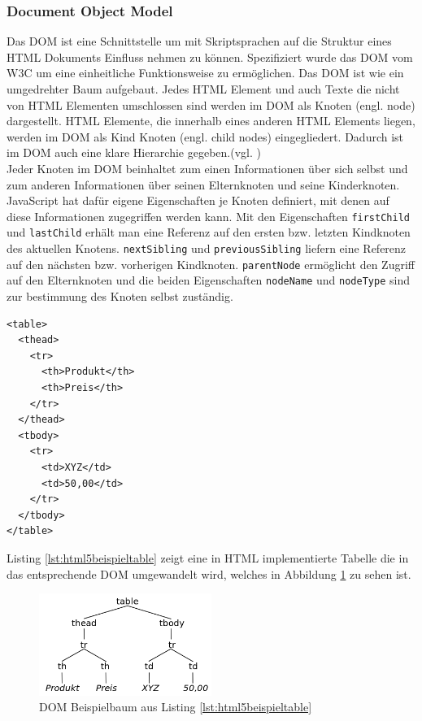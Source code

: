 \subsubsection{Document Object Model} Das DOM ist eine Schnittstelle um mit Skriptsprachen auf die Struktur eines HTML Dokuments Einfluss nehmen zu können. Spezifiziert wurde das DOM vom W3C um eine einheitliche Funktionsweise zu ermöglichen. Das DOM ist wie ein umgedrehter Baum aufgebaut. Jedes HTML Element und auch Texte die nicht von HTML Elementen umschlossen sind werden im DOM als Knoten (engl. node) dargestellt. HTML Elemente, die innerhalb eines anderen HTML Elements liegen, werden im DOM als Kind Knoten (engl. child nodes) eingegliedert. Dadurch ist im DOM auch eine klare Hierarchie gegeben.(vgl. \cite[S.350]{WenzJava2008})\\Jeder Knoten im DOM beinhaltet zum einen Informationen über sich selbst und zum anderen Informationen über seinen Elternknoten und seine Kinderknoten. JavaScript hat dafür eigene Eigenschaften je Knoten definiert, mit denen auf diese Informationen zugegriffen werden kann. Mit den Eigenschaften \texttt{firstChild} und \texttt{lastChild} erhält man eine Referenz auf den ersten bzw. letzten Kindknoten des aktuellen Knotens. \texttt{nextSibling} und \texttt{previousSibling} liefern eine Referenz auf den nächsten bzw. vorherigen Kindknoten. \texttt{parentNode} ermöglicht den Zugriff auf den Elternknoten und die beiden Eigenschaften \texttt{nodeName} und \texttt{nodeType} sind zur bestimmung des Knoten selbst zuständig.

\vspace{1em}
\begin{lstlisting}[language=HTML5, caption=DOM5 Beispiel Definition, label=lst:html5beispieltable]
<table>
  <thead>
    <tr>
      <th>Produkt</th>
      <th>Preis</th>
    </tr>
  </thead>
  <tbody>
    <tr>
      <td>XYZ</td>
      <td>50,00</td>
    </tr>
  </tbody>
</table>
\end{lstlisting}

Listing \ref{lst:html5beispieltable} zeigt eine in HTML implementierte Tabelle die in das entsprechende DOM umgewandelt wird, welches in Abbildung \ref{fig:dombeispielbaum} zu sehen ist.

\vspace{1em}
\begin{figure}[htb]
  \centering
  \includegraphics[width=0.5\textwidth]{abb/dom_sampletree}
  \caption[DOM Beispielbaum aus Listing \ref{lst:html5beispieltable}]{DOM Beispielbaum aus Listing \ref{lst:html5beispieltable}}
  \label{fig:dombeispielbaum}
\end{figure}

